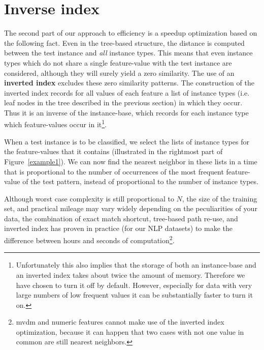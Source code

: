 \documentclass{report}
\begin{document}
\section{Inverse index}
\label{inverse-index}

The second part of our approach to efficiency is a speedup
optimization based on the following fact. Even in the tree-based
structure, the distance is computed between the test instance and {\em
all} instance types. This means that even instance types which do not
share a single feature-value with the test instance are considered,
although they will surely yield a zero similarity. The use of an {\bf
inverted index} excludes these zero similarity patterns.  The
construction of the inverted index records for all values of each
feature a list of instance types (i.e. leaf nodes in the tree
described in the previous section) in which they occur. Thus it is an
inverse of the instance-base, which records for each instance type
which feature-values occur in it\footnote{Unfortunately this also
implies that the storage of both an instance-base and an inverted
index takes about twice the amount of memory. Therefore we have chosen
to turn it off by default. However, especially for data with very
large numbers of low frequent values it can be substantially faster to
turn it on.}.

When a test instance is to be classified, we select the lists of
instance types for the feature-values that it contains (illustrated in
the rightmost part of Figure~\ref{example1}). We can now find the
nearest neighbor in these lists in a time that is proportional to the
number of occurrences of the most frequent feature-value of the test
pattern, instead of proportional to the number of instance types.

Although worst case complexity is still proportional to $N$, the size
of the training set, and practical mileage may vary widely depending
on the peculiarities of your data, the combination of exact match
shortcut, tree-based path re-use, and inverted index has proven in
practice (for our NLP datasets) to make the difference between hours
and seconds of computation\footnote{{\sc mvdm} and numeric features
cannot make use of the inverted index optimization, because it can
happen that two cases with not one value in common are still nearest
neighbors. 
%
}.
\end{document}
